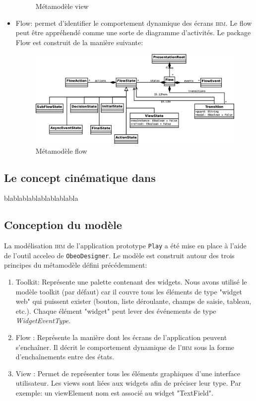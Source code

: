 \begin{itemize}
\begin{figure}[H]
  \caption{Métamodèle view}
  \label{fig:Métamodèle View}
\end{figure}
  \item Flow: permet d'identifier le comportement dynamique des écrans \textsc{ihm}. Le flow peut être appréhendé comme une sorte de diagramme d'activités.
\newline
Le package Flow est construit de la manière suivante:
\newline
\begin{figure}[H]
  \centering
  \includegraphics[scale=.3]{img/flow.eps}
  \caption{Métamodèle flow}
  \label{fig:Métamodèle Flow}
\end{figure}
\end{itemize}
\subsection{Le concept cinématique dans \kwplay{}}
blablablablablablablabla
\subsection{Conception du modèle}
La modélisation \textsc{ihm} de l'application prototype \texttt{Play} a été mise en place à l'aide de l'outil acceleo de \texttt{ObeoDesigner}. Le modèle est construit autour des trois principes du métamodèle défini précédemment:
\begin{enumerate}
\item Toolkit: Représente une palette contenant des widgets. Nous avons utilisé le modèle toolkit (par défaut) car il couvre tous les éléments de type "widget web" qui puissent exister (bouton, liste déroulante, champs de saisie, tableau, etc.). Chaque élément "widget" peut lever des événements de type \textit{WidgetEventType}.
\item Flow : Représente la manière dont les écrans de l'application peuvent s'enchaîner. Il décrit le comportement dynamique de l'\textsc{ihm} sous la forme d'enchaînements entre des états.
\item View : Permet de représenter tous les éléments graphiques d'une interface utilisateur. Les views sont liées aux widgets afin de préciser leur type. Par exemple: un viewElement nom est associé au widget "TextField". 


\end{enumerate}				


